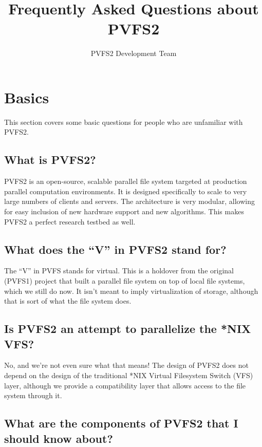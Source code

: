 \documentclass[11pt,letterpaper]{article}
\title{Frequently Asked Questions about PVFS2}
\author{ PVFS2 Development Team }
\begin{document}
\maketitle

\tableofcontents

\thispagestyle{empty}

%
%
\section{Basics}

This section covers some basic questions for people who are unfamiliar with PVFS2.

\subsection{What is PVFS2?}

PVFS2 is an open-source, scalable parallel file system targeted at production
parallel computation environments.  It is designed specifically to scale to
very large numbers of clients and servers.  The architecture is very modular,
allowing for easy inclusion of new hardware support and new algorithms.  This
makes PVFS2 a perfect research testbed as well.

\subsection{What does the ``V'' in PVFS2 stand for?}

The ``V'' in PVFS stands for virtual.  This is a holdover from the original
(PVFS1) project that built a parallel file system on top of local file
systems, which we still do now.  It isn't meant to imply virtualization of
storage, although that is sort of what the file system does.

\subsection{Is PVFS2 an attempt to parallelize the *NIX VFS?}

No, and we're not even sure what that means!  The design of PVFS2 does
not depend on the design of the traditional *NIX Virtual Filesystem
Switch (VFS) layer, although we provide a compatibility layer that
allows access to the file system through it.

\subsection{What are the components of PVFS2 that I should know about?}
\end{document}
